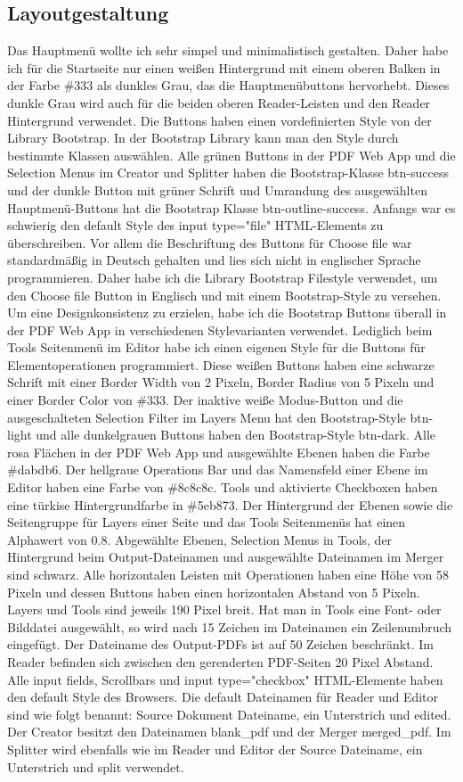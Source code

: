 \subsection{Layoutgestaltung}
Das Hauptmenü wollte ich sehr simpel und minimalistisch gestalten. Daher habe ich für die Startseite nur einen weißen Hintergrund mit einem oberen Balken in der Farbe \#333 als dunkles Grau, das die Hauptmenübuttons hervorhebt. Dieses dunkle Grau wird auch für die beiden oberen Reader-Leisten und den Reader Hintergrund verwendet. Die Buttons haben einen vordefinierten Style von der Library Bootstrap. In der Bootstrap Library kann man den Style durch bestimmte Klassen auswählen. Alle grünen Buttons in der PDF Web App und die Selection Menus im Creator und Splitter haben die Bootstrap-Klasse btn-success und der dunkle Button mit grüner Schrift und Umrandung des ausgewählten Hauptmenü-Buttons hat die Bootstrap Klasse btn-outline-success. Anfangs war es schwierig den default Style des input type="file" HTML-Elements zu überschreiben. Vor allem die Beschriftung des Buttons für Choose file war standardmäßig in Deutsch gehalten und lies sich nicht in englischer Sprache programmieren. Daher habe ich die Library Bootstrap Filestyle verwendet, um den Choose file Button in Englisch und mit einem Bootstrap-Style zu versehen. Um eine Designkonsistenz zu erzielen, habe ich die Bootstrap Buttons überall in der PDF Web App in verschiedenen Stylevarianten verwendet. Lediglich beim Tools Seitenmenü im Editor habe ich einen eigenen Style für die Buttons für Elementoperationen programmiert. Diese weißen Buttons haben eine schwarze Schrift mit einer Border Width von 2 Pixeln, Border Radius von 5 Pixeln und einer Border Color von \#333. Der inaktive weiße Modus-Button und die ausgeschalteten Selection Filter im Layers Menu hat den Bootstrap-Style btn-light und alle dunkelgrauen Buttons haben den Bootstrap-Style btn-dark. Alle rosa Flächen in der PDF Web App und ausgewählte Ebenen haben die Farbe \#dabdb6. Der hellgraue Operations Bar und das Namensfeld einer Ebene im Editor haben eine Farbe von \#8c8c8c. Tools und aktivierte Checkboxen haben eine türkise Hintergrundfarbe in \#5eb873. Der Hintergrund der Ebenen sowie die Seitengruppe für Layers einer Seite und das Tools Seitenmenüs hat einen Alphawert von 0.8. Abgewählte Ebenen, Selection Menus in Tools, der Hintergrund beim Output-Dateinamen und ausgewählte Dateinamen im Merger sind schwarz. Alle horizontalen Leisten mit Operationen haben eine Höhe von 58 Pixeln und dessen Buttons haben einen horizontalen Abstand von 5 Pixeln. Layers und Tools sind jeweils 190 Pixel breit. Hat man in Tools eine Font- oder Bilddatei ausgewählt, so wird nach 15 Zeichen im Dateinamen ein Zeilenumbruch eingefügt. Der Dateiname des Output-PDFs ist auf 50 Zeichen beschränkt. Im Reader befinden sich zwischen den gerenderten PDF-Seiten 20 Pixel Abstand. Alle input fields, Scrollbars und input type="checkbox" HTML-Elemente haben den default Style des Browsers. Die default Dateinamen für Reader und Editor sind wie folgt benannt: Source Dokument Dateiname, ein Unterstrich und edited. Der Creator besitzt den Dateinamen blank\_pdf und der Merger merged\_pdf. Im Splitter wird ebenfalls wie im Reader und Editor der Source Dateiname, ein Unterstrich und split verwendet. 


